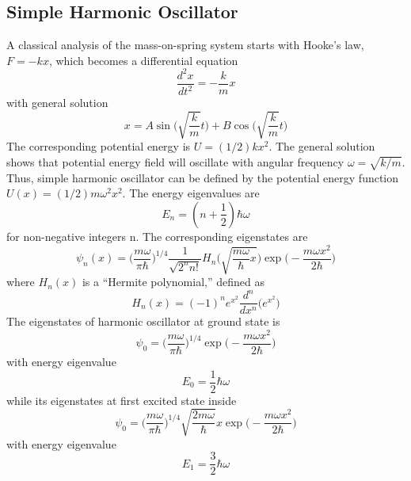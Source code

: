 \documentclass[../../../main.tex]{subfiles}
\begin{document}
\subsection{Simple Harmonic Oscillator}
A classical analysis of the mass-on-spring system starts with Hooke's law, $F = -kx$, which becomes a differential equation 
\begin{equation*}
    \frac{d^2x}{dt^2}=-\frac{k}{m}x
\end{equation*}
with general solution
\begin{equation*}
    x=A\sin \biggl(\sqrt{\frac{k}{m}} t\biggr)+ B \cos \biggl(\sqrt{\frac{k}{m}} t\biggr)
\end{equation*}
The corresponding potential energy is $U=(1/2)kx^2$. The general solution shows that potential energy field will oscillate with angular frequency $\omega = \sqrt{k/m}$. Thus, simple harmonic oscillator can be defined by the potential energy function $U(x) = (1/2)m\omega^2x^2$. The energy eigenvalues are
\begin{equation*}
    E_n = (n + \frac{1}{2})\hbar\omega
\end{equation*}
for non-negative integers n. The corresponding eigenstates are
\begin{equation*}
    \psi_n(x)=\biggl(\frac{m\omega}{\pi \hbar} \biggr)^{1/4}\frac{1}{\sqrt{2^nn!}}H_n \biggl(\sqrt{ \frac{m\omega}{\hbar}x } \biggr) \exp\biggl(-\frac{ m\omega x^2}{2\hbar}\biggr)
\end{equation*}
where $H_n(x)$ is a “Hermite polynomial,” defined as
\begin{equation*}
    H_n(x)=(-1)^ne^{x^2} \frac{d^n}{dx^n}\biggl( e^{x^2} \biggr)
\end{equation*}
The eigenstates of harmonic oscillator at ground state is
\begin{equation*}
    \psi_0=\biggl( \frac{m\omega}{\pi \hbar} \biggr)^{1/4}  \exp\biggl(-\frac{ m\omega x^2}{2\hbar}\biggr)
\end{equation*} 
with energy eigenvalue
\begin{equation*}
    E_0=\frac{1}{2}\hbar\omega
\end{equation*}
while its eigenstates at first excited state inside
\begin{equation*}
    \psi_0=\biggl( \frac{m\omega}{\pi \hbar} \biggr)^{1/4}  \sqrt{\frac{2m\omega}{\hbar}}x \exp\biggl(-\frac{ m\omega x^2}{2\hbar}\biggr)
\end{equation*} 
with energy eigenvalue
\begin{equation*}
    E_1=\frac{3}{2}\hbar\omega
\end{equation*}
\end{document}
